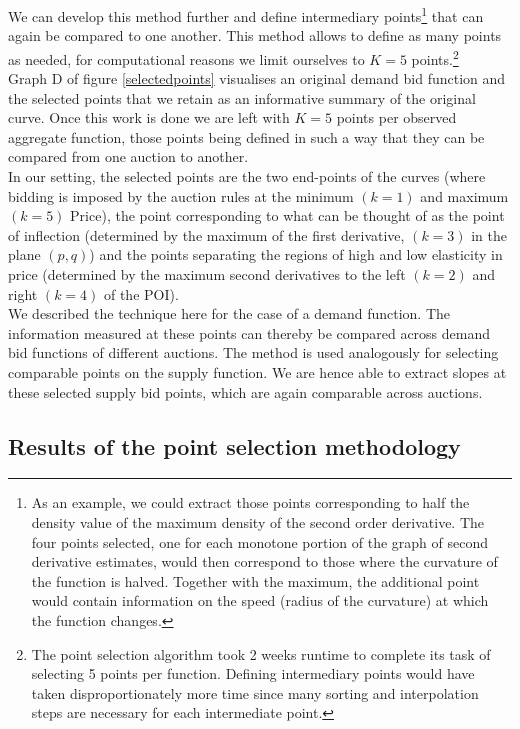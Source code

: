 We can develop this method further and define intermediary points\footnote{As an example, we could extract those points corresponding to half the density value of the maximum density of the second order derivative. The four points selected, one for each monotone portion of the graph of second derivative estimates, would then correspond to those where the curvature of the function is halved. Together with the maximum, the additional point would contain information on the speed (radius of the curvature) at which the function changes.} that can again be compared to one another. This method allows to define as many points as needed, for computational reasons we limit ourselves to $K=5$ points.\footnote{The point selection algorithm took 2 weeks runtime to complete its task of selecting 5 points per function. Defining intermediary points would have taken disproportionately more time since many sorting and interpolation steps are necessary for each intermediate point.} \\

Graph D of figure \ref{selectedpoints} visualises an original demand bid function and the selected points that we retain as an informative summary of the original curve. Once this work is done we are left with $K=5$ points per observed aggregate function, those points being defined in such a way that they can be compared from one auction to another. \\

In our setting, the selected points are the two end-points of the curves (where bidding is imposed by the auction rules at the minimum $(k=1)$ and maximum $(k=5)$ Price), the point corresponding to what can be thought of as the point of inflection (determined by the maximum of the first derivative, $(k=3)$ in the plane $(p,q)$) and the points separating the regions of high and low elasticity in price (determined by the maximum second derivatives to the left $(k=2)$ and right $(k=4)$ of the POI). \\

We described the technique here for the case of a demand function. The information measured at these points can thereby be compared across demand bid functions of different auctions. The method is used analogously for selecting comparable points on the supply function. We are hence able to extract slopes at these selected supply bid points, which are again comparable across auctions.\\


\subsection{Results of the point selection methodology}
\label{pointresults}

